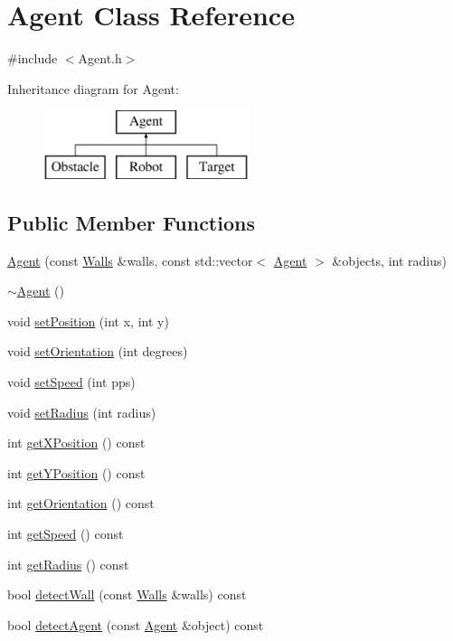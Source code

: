 \hypertarget{classAgent}{\section{Agent Class Reference}
\label{classAgent}
}


{\ttfamily \#include $<$Agent.\-h$>$}

Inheritance diagram for Agent\-:\begin{figure}[H]
\begin{center}
\leavevmode
\includegraphics[height=2.000000cm]{classAgent}
\end{center}
\end{figure}
\subsection*{Public Member Functions}
\begin{DoxyCompactItemize}
\item 
\hyperlink{classAgent_afc61ed889ca97b17b33a3672f672816d}{Agent} (const \hyperlink{classWalls}{Walls} \&walls, const std\-::vector$<$ \hyperlink{classAgent}{Agent} $>$ \&objects, int radius)
\item 
\hyperlink{classAgent_ab8dd8d152605cf1339fed595376e83cb}{$\sim$\-Agent} ()
\item 
void \hyperlink{classAgent_a5d714dac466b3ac67fa8c7922ad16e32}{set\-Position} (int x, int y)
\item 
void \hyperlink{classAgent_ae5421a419adc7a6baaf62657771b58a8}{set\-Orientation} (int degrees)
\item 
void \hyperlink{classAgent_a95a0e20717bc2a97b31297c7fe359edf}{set\-Speed} (int pps)
\item 
void \hyperlink{classAgent_a56f8cf41867560850cf4a8f06a8fb73a}{set\-Radius} (int radius)
\item 
int \hyperlink{classAgent_aba769a0dc44309d432ff7f4187042bf1}{get\-X\-Position} () const 
\item 
int \hyperlink{classAgent_abd92e3a22a129c3714fbeddfc884c2da}{get\-Y\-Position} () const 
\item 
int \hyperlink{classAgent_ac2cdb165917961b3e0eddf63d1e8d4ad}{get\-Orientation} () const 
\item 
int \hyperlink{classAgent_aa4d6903e90ac8b43a0ba8a1b976b1e17}{get\-Speed} () const 
\item 
int \hyperlink{classAgent_a624340216590b8ac5e74ba5206eb5c76}{get\-Radius} () const 
\item 
bool \hyperlink{classAgent_afc5a6ffaacf9c65e9cb39220b82b89ab}{detect\-Wall} (const \hyperlink{classWalls}{Walls} \&walls) const 
\item 
bool \hyperlink{classAgent_a89fc8e0caac6f98f818fcf6e58e78c78}{detect\-Agent} (const \hyperlink{classAgent}{Agent} \&object) const 
\end{DoxyCompactItemize}



